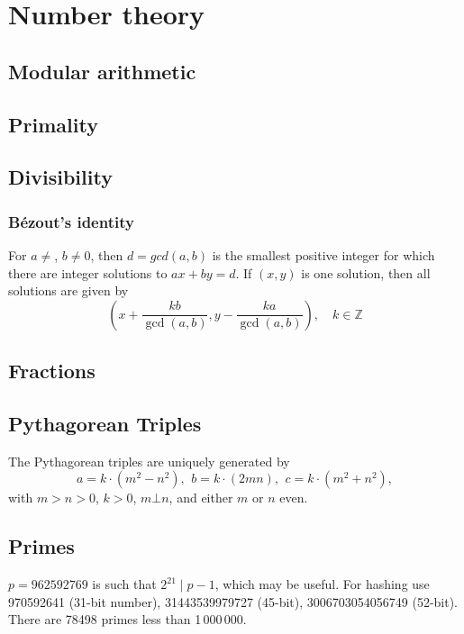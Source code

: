 \chapter{Number theory}

\section{Modular arithmetic}

\section{Primality}

\section{Divisibility}

	\subsection{Bézout's identity}
	For $a \neq $, $b \neq 0$, then $d=gcd(a,b)$ is the smallest positive integer for which there are integer solutions to $ax+by=d$.
	If $(x,y)$ is one solution, then all solutions are given by
	$$\left(x+\frac{kb}{\gcd(a,b)}, y-\frac{ka}{\gcd(a,b)}\right), \quad k\in\mathbb{Z}$$


\section{Fractions}

\section{Pythagorean Triples}
 The Pythagorean triples are uniquely generated by
 \[ a=k\cdot (m^{2}-n^{2}),\ \,b=k\cdot (2mn),\ \,c=k\cdot (m^{2}+n^{2}), \]
 with $m > n > 0$, $k > 0$, $m \bot n$, and either $m$ or $n$ even.

\section{Primes}
	$p=962592769$ is such that $2^{21} \mid p-1$, which may be useful. For hashing
	use 970592641 (31-bit number), 31443539979727 (45-bit), 3006703054056749
	(52-bit). There are 78498 primes less than 1\,000\,000.

